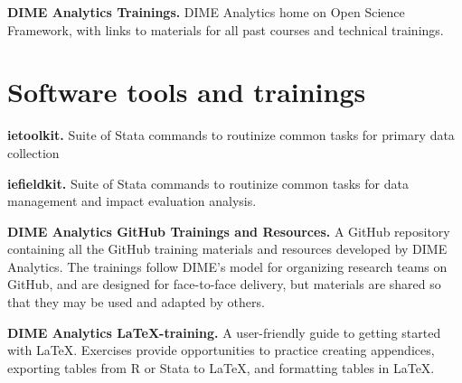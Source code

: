 \resourcepar\textbf{DIME Analytics Trainings.}
DIME Analytics home on Open Science Framework,
with links to materials for all past courses and technical trainings.


\section{Software tools and trainings}

\textbf{ietoolkit.}
Suite of Stata commands to routinize common tasks for primary data collection

\resourcepar\textbf{iefieldkit.}
Suite of Stata commands to routinize common tasks for
data management and impact evaluation analysis.

\resourcepar\textbf{DIME Analytics GitHub Trainings and Resources.}
A GitHub repository containing all
the GitHub training materials and resources developed by DIME Analytics.
The trainings follow DIME's model for organizing research teams on GitHub,
and are designed for face-to-face delivery,
but materials are shared so that they may be used and adapted by others.

\resourcepar\textbf{DIME Analytics \LaTeX-training.}
A user-friendly guide to getting started with LaTeX.
Exercises provide opportunities to
practice creating appendices,
exporting tables from R or Stata to LaTeX,
and formatting tables in LaTeX.


\mainmatter
